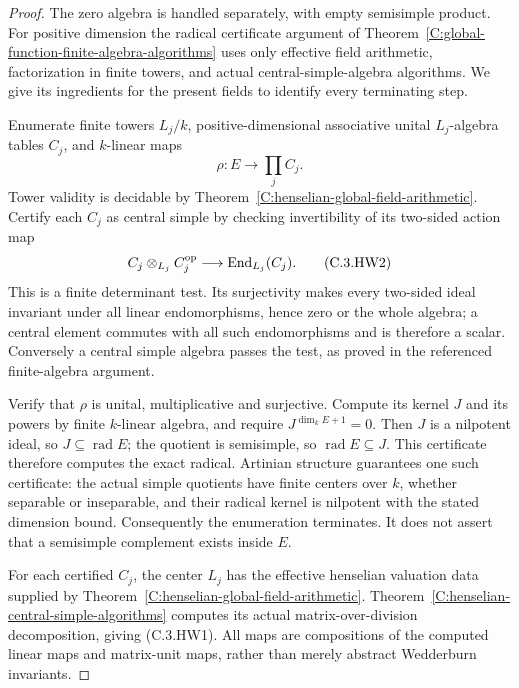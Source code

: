 \begin{proof}
The zero algebra is handled separately,
with empty semisimple product.
For positive dimension the radical
certificate argument of
Theorem~\ref{C:global-function-finite-algebra-algorithms}
uses only effective field arithmetic,
factorization in finite towers, and
actual central-simple-algebra algorithms.
We give its ingredients for the present
fields to identify every terminating step.

Enumerate finite towers $L_j/k$,
positive-dimensional associative unital
$L_j$-algebra tables $C_j$, and
$k$-linear maps
\[
              \rho:E\longrightarrow\prod_j C_j.
\]
Tower validity is decidable by
Theorem~\ref{C:henselian-global-field-arithmetic}.
Certify each $C_j$ as central simple
by checking invertibility of its
two-sided action map
\[
 C_j\otimes_{L_j}C_j^{\rm op}
                 \longrightarrow\operatorname{End}_{L_j}(C_j).
                                                               \tag{C.3.HW2}
\]
This is a finite determinant test.
Its surjectivity makes every two-sided
ideal invariant under all linear
endomorphisms, hence zero or the
whole algebra; a central element
commutes with all such endomorphisms
and is therefore a scalar.
Conversely a central simple algebra
passes the test, as proved in the
referenced finite-algebra argument.

Verify that $\rho$ is unital,
multiplicative and surjective.
Compute its kernel $J$ and its
powers by finite $k$-linear algebra,
and require $J^{\dim_kE+1}=0$.
Then $J$ is a nilpotent ideal,
so $J\subseteq\operatorname{rad}E$;
the quotient is semisimple, so
$\operatorname{rad}E\subseteq J$.
This certificate therefore computes
the exact radical.
Artinian structure guarantees one
such certificate: the actual simple
quotients have finite centers over
$k$, whether separable or inseparable,
and their radical kernel is nilpotent
with the stated dimension bound.
Consequently the enumeration terminates.
It does not assert that a semisimple
complement exists inside $E$.

For each certified $C_j$, the center
$L_j$ has the effective henselian
valuation data supplied by
Theorem~\ref{C:henselian-global-field-arithmetic}.
Theorem~\ref{C:henselian-central-simple-algorithms}
computes its actual matrix-over-division
decomposition, giving (C.3.HW1).
All maps are compositions of the
computed linear maps and matrix-unit
maps, rather than merely abstract
Wedderburn invariants.


\end{proof}
